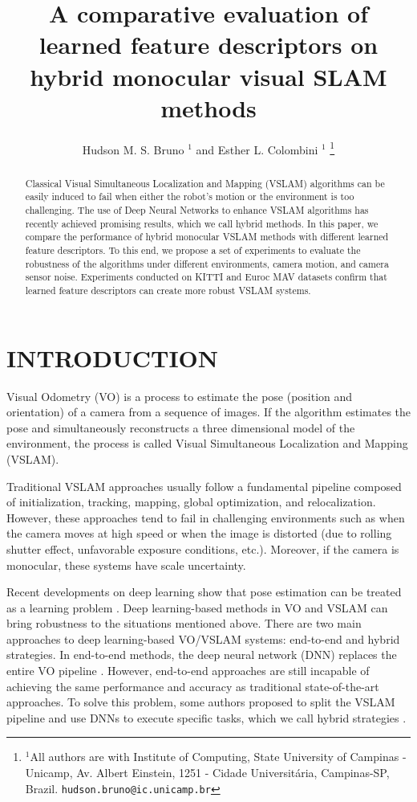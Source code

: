 \documentclass[a4paper, 10pt, conference]{ieeeconf}      %
\title{\LARGE \bf A comparative evaluation of learned feature descriptors on hybrid monocular visual SLAM methods}
\author{Hudson M. S. Bruno $^{1}$ and Esther L. Colombini $^{1}$%
\thanks{$^{1}$All authors are with Institute of Computing, State University of Campinas - Unicamp, Av. Albert Einstein, 1251 - Cidade Universitária, Campinas-SP, Brazil.
{\tt\small hudson.bruno@ic.unicamp.br}}%
}
\begin{document}
\maketitle
\thispagestyle{empty}
\pagestyle{empty}


\begin{abstract}
Classical Visual Simultaneous Localization and Mapping (VSLAM) algorithms can be easily induced to fail when either the robot's motion or the environment is too challenging. The use of Deep Neural Networks to enhance VSLAM algorithms has recently achieved promising results, which we call hybrid methods. In this paper, we compare the performance of hybrid monocular VSLAM methods with different learned feature descriptors. To this end, we propose a set of experiments to evaluate the robustness of the algorithms under different environments, camera motion, and camera sensor noise. Experiments conducted on KITTI and Euroc MAV datasets confirm that learned feature descriptors can create more robust VSLAM systems.
\end{abstract}


\section{INTRODUCTION}

\label{sec:introduction}

Visual Odometry (VO) is a process to estimate the pose (position and orientation) of a camera from a sequence of images. If the algorithm estimates the pose and simultaneously reconstructs a three dimensional model of the environment, the process is called Visual Simultaneous Localization and Mapping (VSLAM).

Traditional VSLAM approaches usually follow a fundamental pipeline composed of initialization, tracking, mapping, global optimization, and relocalization. However, these approaches tend to fail in challenging environments such as when the camera moves at high speed or when the image is distorted (due to rolling shutter effect, unfavorable exposure conditions, etc.). Moreover, if the camera is monocular, these systems have scale uncertainty.

Recent developments on deep learning show that pose estimation can be treated as a learning problem \cite{survey-dynamic-envs}. Deep learning-based methods in VO and VSLAM can bring robustness to the situations mentioned above. There are two main approaches to deep learning-based VO/VSLAM systems: end-to-end and hybrid strategies. In end-to-end methods, the deep neural network (DNN) replaces the entire VO pipeline \cite{deep-vo, undeep-vo, attention-based}. However, end-to-end approaches are still incapable of achieving the same performance and accuracy as traditional state-of-the-art approaches. To solve this problem, some authors proposed to split the VSLAM pipeline and use DNNs to execute specific tasks, which we call hybrid strategies \cite{cnn-relocalisation, pose-graph-optimization, monocular-depth}.
\end{document}
